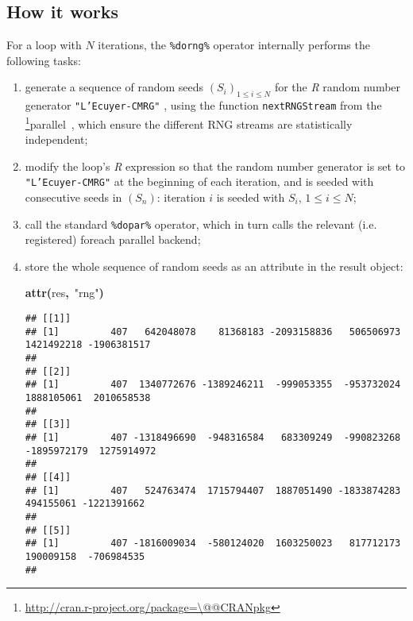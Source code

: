 \documentclass[a4paper,12pt]{article}\usepackage{graphicx, color}
\makeatletter
\newcommand{\hlfunctioncall}[1]{\textcolor[rgb]{0.501960784313725,0,0.329411764705882}{\textbf{#1}}}%
\newcommand{\hlstring}[1]{\textcolor[rgb]{0.6,0.6,1}{#1}}%
\newcommand{\hlkeyword}[1]{\textcolor[rgb]{0,0,0}{\textbf{#1}}}%
\newcommand{\hlsymbol}[1]{\textcolor[rgb]{0,0,0}{#1}}%
\newenvironment{kframe}{%
 \def\FrameCommand##1{\hskip\@totalleftmargin \hskip-\fboxsep
 \colorbox{shadecolor}{##1}\hskip-\fboxsep
     \hskip-\linewidth \hskip-\@totalleftmargin \hskip\columnwidth}%
 \MakeFramed {\advance\hsize-\width
   \@totalleftmargin\z@ \linewidth\hsize
   \@setminipage}}%
 {\par\unskip\endMakeFramed}
\newenvironment{knitrout}{}{} %
\renewenvironment{knitrout}{\begin{footnotesize}}{\end{footnotesize}}
\let\proglang=\textit
\let\code=\texttt
\newcommand{\pkgname}[1]{\textit{#1}\xspace}
\newcommand{\CRANurl}[1]{\url{http://cran.r-project.org/package=#1}}
\def\CRANpkg{\@ifstar\@CRANpkg\@@CRANpkg}
\def\@CRANpkg#1{\href{http://cran.r-project.org/package=#1}{\pkgname{#1}}\footnote{\CRANurl{#1}}}
\def\@@CRANpkg#1{\href{http://cran.r-project.org/package=#1}{\pkgname{#1}} package\footnote{\CRANurl{#1}}}
\newcommand{\citeCRANpkg}[1]{\CRANpkg{#1}~\cite{#1}}
\makeatother
\begin{document}
\subsection{How it works}
For a loop with $N$ iterations, the \code{\%dorng\%} operator internally
performs the following tasks:
\begin{enumerate}
  \item generate a sequence of random seeds $(S_i)_{1\leq i\leq N}$ for the \proglang{R} random number
  generator \code{"L'Ecuyer-CMRG"} \cite{Lecuyer1999}, using
  the function \code{nextRNGStream} from the \citeCRANpkg{parallel},
  which ensure the different RNG streams are statistically independent;
  \item modify the loop's \proglang{R} expression so that the random number
  generator is set to \code{"L'Ecuyer-CMRG"} at the beginning of each
  iteration, and is seeded with consecutive seeds in $(S_n)$: iteration $i$ is
  seeded with $S_i$, $1\leq i\leq N$;
  \item call the standard \code{\%dopar\%} operator, which in turn
  calls the relevant (i.e. registered) foreach parallel backend;
  \item store the whole sequence of random seeds as an attribute in the result
  object:
\begin{knitrout}
\color{fgcolor}\begin{kframe}
\begin{flushleft}
\ttfamily\noindent
\hlfunctioncall{attr}\hlkeyword{(}\hlsymbol{res}\hlkeyword{,}{\ }\hlstring{"{}rng"{}}\hlkeyword{)}\mbox{}
\normalfont
\end{flushleft}
\begin{verbatim}
## [[1]]
## [1]         407   642048078    81368183 -2093158836   506506973  1421492218 -1906381517
## 
## [[2]]
## [1]         407  1340772676 -1389246211  -999053355  -953732024  1888105061  2010658538
## 
## [[3]]
## [1]         407 -1318496690  -948316584   683309249  -990823268 -1895972179  1275914972
## 
## [[4]]
## [1]         407   524763474  1715794407  1887051490 -1833874283   494155061 -1221391662
## 
## [[5]]
## [1]         407 -1816009034  -580124020  1603250023   817712173   190009158  -706984535
## 
\end{verbatim}
\end{kframe}
\end{knitrout}

\end{enumerate}
\end{document}
